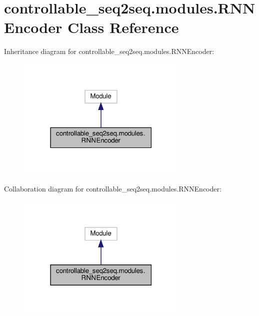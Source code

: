 \hypertarget{classcontrollable__seq2seq_1_1modules_1_1RNNEncoder}{}\section{controllable\+\_\+seq2seq.\+modules.\+R\+N\+N\+Encoder Class Reference}
\label{classcontrollable__seq2seq_1_1modules_1_1RNNEncoder}


Inheritance diagram for controllable\+\_\+seq2seq.\+modules.\+R\+N\+N\+Encoder\+:
\nopagebreak
\begin{figure}[H]
\begin{center}
\leavevmode
\includegraphics[width=231pt]{classcontrollable__seq2seq_1_1modules_1_1RNNEncoder__inherit__graph}
\end{center}
\end{figure}


Collaboration diagram for controllable\+\_\+seq2seq.\+modules.\+R\+N\+N\+Encoder\+:
\nopagebreak
\begin{figure}[H]
\begin{center}
\leavevmode
\includegraphics[width=231pt]{classcontrollable__seq2seq_1_1modules_1_1RNNEncoder__coll__graph}
\end{center}
\end{figure}
